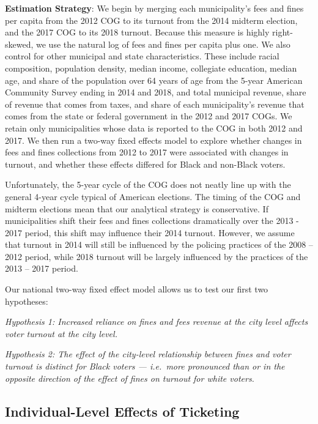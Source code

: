 \documentclass[
  12pt,
]{article}
\begin{document}
\textbf{Estimation Strategy}: We begin by merging each municipality's fees and fines per capita from the 2012 COG to its turnout from the 2014 midterm election, and the 2017 COG to its 2018 turnout. Because this measure is highly right-skewed, we use the natural log of fees and fines per capita plus one. We also control for other municipal and state characteristics. These include racial composition, population density, median income, collegiate education, median age, and share of the population over 64 years of age from the 5-year American Community Survey ending in 2014 and 2018, and total municipal revenue, share of revenue that comes from taxes, and share of each municipality's revenue that comes from the state or federal government in the 2012 and 2017 COGs. We retain only municipalities whose data is reported to the COG in both 2012 and 2017. We then run a two-way fixed effects model to explore whether changes in fees and fines collections from 2012 to 2017 were associated with changes in turnout, and whether these effects differed for Black and non-Black voters.

Unfortunately, the 5-year cycle of the COG does not neatly line up with the general 4-year cycle typical of American elections. The timing of the COG and midterm elections mean that our analytical strategy is conservative. If municipalities shift their fees and fines collections dramatically over the 2013 - 2017 period, this shift may influence their 2014 turnout. However, we assume that turnout in 2014 will still be influenced by the policing practices of the 2008 -- 2012 period, while 2018 turnout will be largely influenced by the practices of the 2013 -- 2017 period.

Our national two-way fixed effect model allows us to test our first two hypotheses:

\emph{Hypothesis 1: Increased reliance on fines and fees revenue at the city level affects voter turnout at the city level.}

\emph{Hypothesis 2: The effect of the city-level relationship between fines and voter turnout is distinct for Black voters --- i.e.~more pronounced than or in the opposite direction of the effect of fines on turnout for white voters.}

\hypertarget{individual-level-effects-of-ticketing}{%
\subsection*{Individual-Level Effects of Ticketing}\label{individual-level-effects-of-ticketing}}
\end{document}
